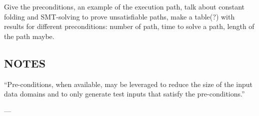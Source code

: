 Give the preconditions, an example of the execution path, talk about constant folding
and SMT-solving to prove unsatisfiable paths, make a table(?) with results for different
preconditions: number of path, time to solve a path, length of the path maybe.

\subsection{NOTES}

``Pre-conditions, when
available, may be leveraged to reduce the size of the input
data domains and to only generate test inputs that satisfy
the pre-conditions.''


---
